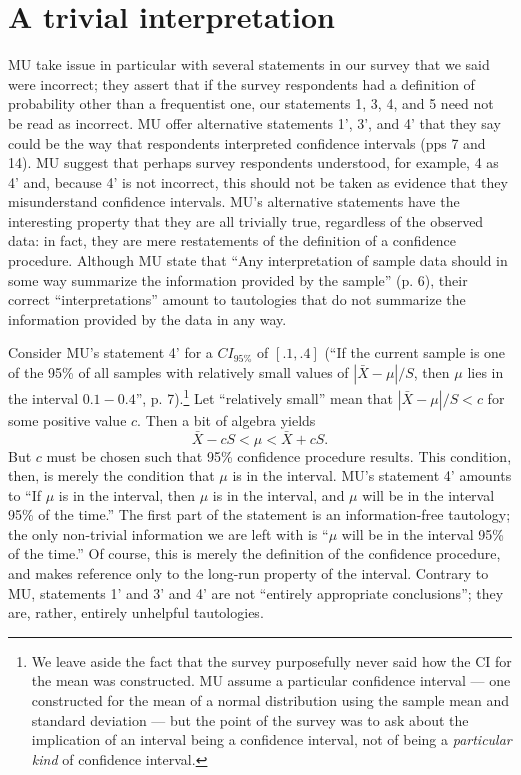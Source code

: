 \documentclass[jou,a4paper,floatsintext,draftfirst]{apa6}\usepackage[]{graphicx}\usepackage[]{color}
\begin{document}
\section{A trivial interpretation}

MU take issue in particular with several statements in our survey that we said were incorrect; they assert that if the survey respondents had a definition of probability other than a frequentist one, our statements 1, 3, 4, and 5 need not be read as incorrect. MU offer alternative statements 1', 3', and 4' that they say could be the way that respondents interpreted confidence intervals (pps 7 and 14). MU suggest that perhaps survey respondents understood, for example, 4 as 4' and, because 4' is not incorrect, this should not be taken as evidence that they misunderstand confidence intervals. MU's alternative statements have the interesting property that they are all trivially true, regardless of the observed data: in fact, they are mere restatements of the definition of a confidence procedure. Although MU state that ``Any interpretation of sample data should in some way summarize the information provided by the sample'' (p. 6), their correct ``interpretations'' amount to tautologies that do not summarize the information provided by the data in any way.

Consider MU's statement 4' for a $CI_{95\%}$ of $[.1, .4]$ (``If the current sample is one of the 95\% of all samples with relatively small values of $|\bar{X}-\mu|/S$, then $\mu$ lies in the interval $0.1-0.4$'', p. 7).\footnote{We leave aside the fact that the survey purposefully never said how the CI for the mean was constructed. MU assume a particular confidence interval --- one constructed for the mean of a normal distribution using the sample mean and standard deviation --- but the point of the survey was to ask about the implication of an interval being a confidence interval, not of being a {\em particular kind} of confidence interval.} Let ``relatively small'' mean that $|\bar{X}-\mu|/S<c$ for some positive value $c$. Then a bit of algebra yields 
\[
\bar{X} - cS < \mu < \bar{X} + cS.
\]
But $c$ must be chosen such that 95\% confidence procedure results. This condition, then, is merely the condition that $\mu$ is in the interval. MU's statement 4' amounts to ``If $\mu$ is in the interval, then $\mu$ is in the interval, and $\mu$ will be in the interval 95\% of the time.'' The first part of the statement is an information-free tautology; the only non-trivial information we are left with is ``$\mu$ will be in the interval 95\% of the time.'' Of course, this is merely the definition of the confidence procedure, and makes reference only to the long-run property of the interval. Contrary to MU, statements 1' and 3' and 4' are not ``entirely appropriate conclusions''; they are, rather, entirely unhelpful tautologies.
\end{document}
